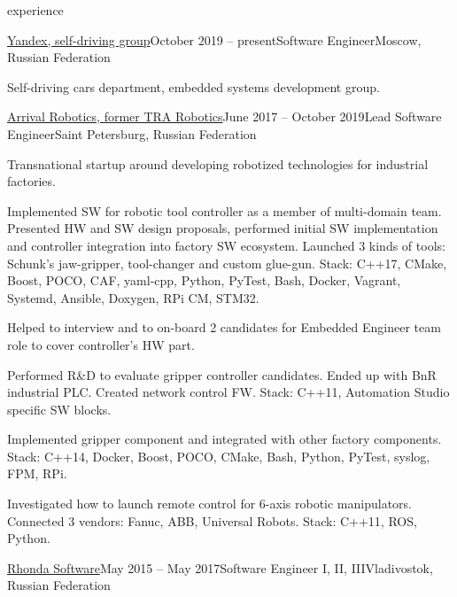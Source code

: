 \documentclass{template}
\begin{document}
\begin{rSection}{experience}
\begin{rCompany}{\href{https://sdc.yandex.com/}{Yandex, self-driving group}}{October 2019 -- present}{Software Engineer}{Moscow, Russian Federation}

\item Self-driving cars department, embedded systems development group.

\end{rCompany}
\begin{rCompany}{\href{https://arrival.com/}{Arrival Robotics, former TRA Robotics}}{June 2017 -- October 2019}{Lead Software Engineer}{Saint Petersburg, Russian Federation}

\item Transnational startup around developing robotized technologies for industrial factories.
\item Implemented SW for robotic tool controller as a member of multi-domain team. Presented HW and SW design proposals, performed initial SW implementation and
      controller integration into factory SW ecosystem. Launched 3 kinds of tools: Schunk's jaw-gripper, tool-changer and custom glue-gun.
      Stack: C++17, CMake, Boost, POCO, CAF, yaml-cpp, Python, PyTest, Bash, Docker, Vagrant, Systemd, Ansible, Doxygen, RPi CM, STM32.
\item Helped to interview and to on-board 2 candidates for Embedded Engineer team role to cover controller's HW part.
\item Performed R\&D to evaluate gripper controller candidates. Ended up with BnR industrial PLC.
      Created network control FW. Stack: C++11, Automation Studio specific SW blocks.
\item Implemented gripper component and integrated with other factory components.
      Stack: C++14, Docker, Boost, POCO, CMake, Bash, Python, PyTest, syslog, FPM, RPi.
\item Investigated how to launch remote control for 6-axis robotic manipulators. Connected 3 vendors: Fanuc, ABB, Universal Robots. Stack: C++11, ROS, Python.

\end{rCompany}
\begin{rCompany}{\href{http://www.rhondasoftware.com}{Rhonda Software}}{May 2015 -- May 2017}{Software Engineer I, II, III}{Vladivostok, Russian Federation}


\end{rCompany}
\end{rSection}
\end{document}
